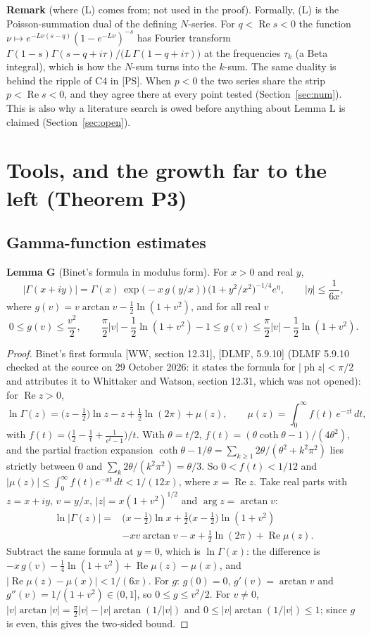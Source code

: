 \documentclass[11pt]{article}
\newcommand{\re}{\operatorname{Re}}
\begin{document}
\medskip
\noindent\textbf{Remark} (where (L) comes from; not used in the proof). Formally, (L) is the Poisson-summation dual of the defining $N$-series. For $q<\re s<0$ the function $\nu\mapsto e^{-L\nu(s-q)}(1-e^{-L\nu})^{-s}$ has Fourier transform $\Gamma(1-s)\Gamma(s-q+i\tau)/\bigl(L\,\Gamma(1-q+i\tau)\bigr)$ at the frequencies $\tau_k$ (a Beta integral), which is how the $N$-sum turns into the $k$-sum. The same duality is behind the ripple of C4 in [PS]. When $p<0$ the two series share the strip $p<\re s<0$, and they agree there at every point tested (Section~\ref{sec:num}). This is also why a literature search is owed before anything about Lemma L is claimed (Section~\ref{sec:open}).

\section{Tools, and the growth far to the left (Theorem P3)}\label{sec:P3}

\subsection{Gamma-function estimates}

\noindent\textbf{Lemma G} (Binet's formula in modulus form). For $x>0$ and real $y$,
\[
|\Gamma(x+iy)|=\Gamma(x)\,\exp\bigl(-x\,g(y/x)\bigr)\,\bigl(1+y^2/x^2\bigr)^{-1/4}e^{\eta},\qquad|\eta|\le\frac{1}{6x},
\]
where $g(v)=v\arctan v-\frac12\ln(1+v^2)$, and for all real $v$
\[
0\le g(v)\le\frac{v^2}{2},\qquad \frac\pi2|v|-\frac12\ln(1+v^2)-1\le g(v)\le\frac\pi2|v|-\frac12\ln(1+v^2).
\]

\begin{proof}
Binet's first formula [WW, section 12.31], [DLMF, 5.9.10] (DLMF 5.9.10 checked at the source on 29 October 2026: it states the formula for $|\operatorname{ph}z|<\pi/2$ and attributes it to Whittaker and Watson, section 12.31, which was not opened): for $\re z>0$,
\[
\ln\Gamma(z)=\bigl(z-\tfrac12\bigr)\ln z-z+\tfrac12\ln(2\pi)+\mu(z),\qquad \mu(z)=\int_0^\infty f(t)\,e^{-zt}\,dt,
\]
with $f(t)=\bigl(\frac12-\frac1t+\frac{1}{e^t-1}\bigr)/t$. With $\theta=t/2$, $f(t)=(\theta\coth\theta-1)/(4\theta^2)$, and the partial fraction expansion $\coth\theta-1/\theta=\sum_{k\ge1}2\theta/(\theta^2+k^2\pi^2)$ lies strictly between $0$ and $\sum_k2\theta/(k^2\pi^2)=\theta/3$. So $0<f(t)<1/12$ and $|\mu(z)|\le\int_0^\infty f(t)e^{-xt}\,dt<1/(12x)$, where $x=\re z$. Take real parts with $z=x+iy$, $v=y/x$, $|z|=x(1+v^2)^{1/2}$ and $\arg z=\arctan v$:
\begin{align*}
\ln|\Gamma(z)|={}&\bigl(x-\tfrac12\bigr)\ln x+\tfrac12\bigl(x-\tfrac12\bigr)\ln(1+v^2)\\
&-xv\arctan v-x+\tfrac12\ln(2\pi)+\re\mu(z).
\end{align*}
Subtract the same formula at $y=0$, which is $\ln\Gamma(x)$: the difference is $-x\,g(v)-\frac14\ln(1+v^2)+\re\mu(z)-\mu(x)$, and $|\re\mu(z)-\mu(x)|<1/(6x)$. For $g$: $g(0)=0$, $g'(v)=\arctan v$ and $g''(v)=1/(1+v^2)\in(0,1]$, so $0\le g\le v^2/2$. For $v\ne0$, $|v|\arctan|v|=\frac\pi2|v|-|v|\arctan(1/|v|)$ and $0\le|v|\arctan(1/|v|)\le1$; since $g$ is even, this gives the two-sided bound.
\end{proof}
\end{document}
